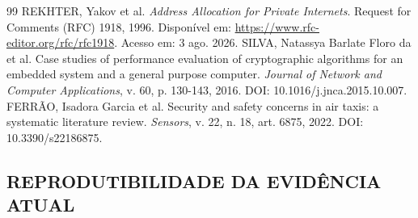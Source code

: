 \begin{thebibliography}{99}
 REKHTER, Yakov et al. \textit{Address Allocation for Private Internets}. Request for Comments (RFC) 1918, 1996. Disponível em: \url{https://www.rfc-editor.org/rfc/rfc1918}. Acesso em: 3 ago. 2026.
 SILVA, Natassya Barlate Floro da et al. Case studies of performance evaluation of cryptographic algorithms for an embedded system and a general purpose computer. \textit{Journal of Network and Computer Applications}, v. 60, p. 130-143, 2016. DOI: 10.1016/j.jnca.2015.10.007.
 FERRÃO, Isadora Garcia et al. Security and safety concerns in air taxis: a systematic literature review. \textit{Sensors}, v. 22, n. 18, art. 6875, 2022. DOI: 10.3390/s22186875.
\end{thebibliography}

\begin{apendicesenv}
\chapter{REPRODUTIBILIDADE DA EVIDÊNCIA ATUAL}
\label{cap:reprodutibilidade}


\end{apendicesenv}
